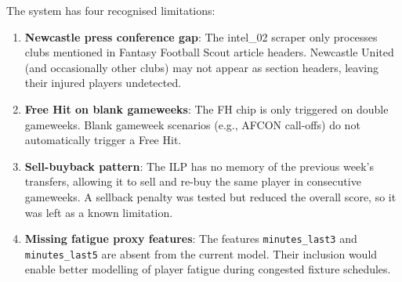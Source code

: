 The system has four recognised limitations:

\begin{enumerate}
  \item \textbf{Newcastle press conference gap}: The intel\_02 scraper only processes clubs mentioned in Fantasy Football Scout article headers. Newcastle United (and occasionally other clubs) may not appear as section headers, leaving their injured players undetected.

  \item \textbf{Free Hit on blank gameweeks}: The FH chip is only triggered on double gameweeks. Blank gameweek scenarios (e.g., AFCON call-offs) do not automatically trigger a Free Hit.

  \item \textbf{Sell-buyback pattern}: The ILP has no memory of the previous week's transfers, allowing it to sell and re-buy the same player in consecutive gameweeks. A sellback penalty was tested but reduced the overall score, so it was left as a known limitation.

  \item \textbf{Missing fatigue proxy features}: The features \texttt{minutes\_last3} and \texttt{minutes\_last5} are absent from the current model. Their inclusion would enable better modelling of player fatigue during congested fixture schedules.
\end{enumerate}
